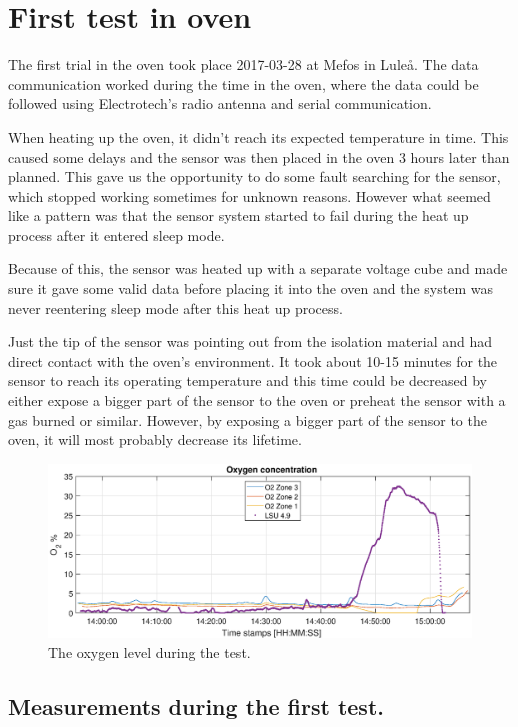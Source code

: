 \section{First test in oven}

The first trial in the oven took place 2017-03-28 at Mefos in Lule\r{a}. The data communication worked during the time in the oven, where the data could be followed using Electrotech's radio antenna and serial communication.

When heating up the oven, it didn't reach its expected temperature in time. This caused some delays and the sensor was then placed in the oven 3 hours later than planned. This gave us the opportunity to do some fault searching for the sensor, which stopped working sometimes for unknown reasons. However what seemed like a pattern was that the sensor system started to fail during the heat up process after it entered sleep mode.


Because of this, the sensor was heated up with a separate voltage cube and made sure it gave some valid data before placing it into the oven and the system was never reentering sleep mode after this heat up process.


Just the tip of the sensor was pointing out from the isolation material and had direct contact with the oven's environment. It took about 10-15 minutes for the sensor to reach its operating temperature and this time could be decreased by either expose a bigger part of the sensor to the oven or preheat the sensor with a gas burned or similar. However, by exposing a bigger part of the sensor to the oven, it will most probably decrease its lifetime.

\begin{figure}
    \centering
    \includegraphics[width=\textwidth]{Chapter4/Figures/syre_dots.eps}
    \caption{The oxygen level during the test.}
    \label{fig:syre_dots}
\end{figure}

\subsection{Measurements during the first test.}

